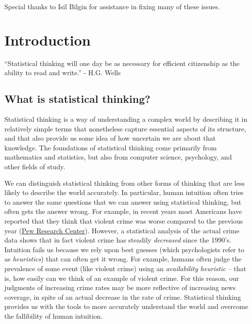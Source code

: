 \documentclass[12pt,]{book}
\theoremstyle{definition}
\theoremstyle{definition}
\theoremstyle{definition}
\theoremstyle{remark}
\begin{document}
Special thanks to Isil Bilgin for assistance in fixing many of these issues.

\hypertarget{introduction}{%
\chapter{Introduction}\label{introduction}}

``Statistical thinking will one day be as necessary for efficient citizenship as the ability to read and write.'' - H.G. Wells

\hypertarget{what-is-statistical-thinking}{%
\section{What is statistical thinking?}\label{what-is-statistical-thinking}}

Statistical thinking is a way of understanding a complex world by describing it in relatively simple terms that nonetheless capture essential aspects of its structure, and that also provide us some idea of how uncertain we are about that knowledge. The foundations of statistical thinking come primarily from mathematics and statistics, but also from computer science, psychology, and other fields of study.

We can distinguish statistical thinking from other forms of thinking that are less likely to describe the world accurately. In particular, human intuition often tries to answer the same questions that we can answer using statistical thinking, but often gets the answer wrong. For example, in recent years most Americans have reported that they think that violent crime was worse compared to the previous year (\href{http://www.pewresearch.org/fact-tank/2018/01/30/5-facts-about-crime-in-the-u-s/}{Pew Research Center}). However, a statistical analysis of the actual crime data shows that in fact violent crime has steadily \emph{decreased} since the 1990's. Intuition fails us because we rely upon best guesses (which psychologists refer to as \emph{heuristics}) that can often get it wrong. For example, humans often judge the prevalence of some event (like violent crime) using an \emph{availability heuristic} -- that is, how easily can we think of an example of violent crime. For this reason, our judgments of increasing crime rates may be more reflective of increasing news coverage, in spite of an actual decrease in the rate of crime. Statistical thinking provides us with the tools to more accurately understand the world and overcome the fallibility of human intuition.
\end{document}
